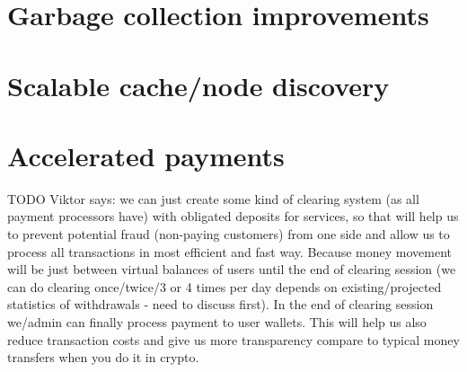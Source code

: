 \documentclass[11pt,fleqn,openany]{book}
\newcommand{\todo}[1]{{\color{red} TODO #1 }}
\begin{document}
\section{Garbage collection improvements}
\section{Scalable cache/node discovery}\label{sec:future-cache}

\section{Accelerated payments}

\todo{Viktor says:
we can just create some kind of clearing system (as all payment processors have) with obligated deposits for services, so that will help us to prevent potential fraud (non-paying customers) from one side and allow us to process all transactions in most efficient and fast way. Because money movement will be just between virtual balances of users until the end of clearing session (we can do clearing once/twice/3 or 4 times per day depends on existing/projected statistics of withdrawals - need to discuss first). In the end of clearing session we/admin can finally process payment to user wallets. This will help us also reduce transaction costs and give us more transparency compare to typical money transfers when you do it in crypto.
}
\end{document}
